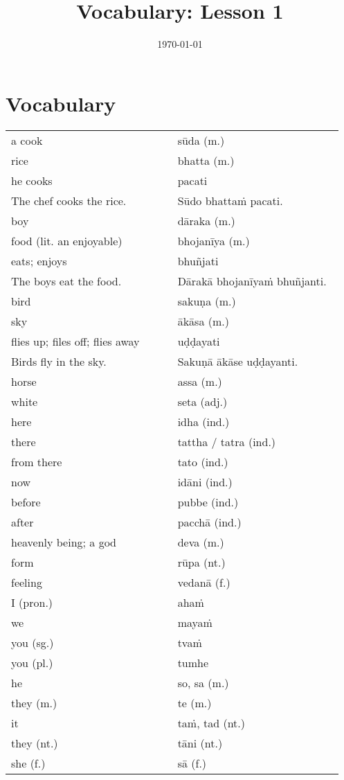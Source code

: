 \documentclass[a5paper]{memoir}
\date{\today}
\title{Vocabulary: Lesson 1}
\begin{document}
\chapter{Vocabulary}
\label{sec:orgc15ddb6}

\begin{longtable}{L{0.48\linewidth} L{0.48\linewidth}}
a cook & sūda (m.)\\[0pt]
rice & bhatta (m.)\\[0pt]
he cooks & pacati\\[0pt]
The chef cooks the rice. & Sūdo bhattaṁ pacati.\\[0pt]
boy & dāraka (m.)\\[0pt]
food (lit. an enjoyable) & bhojanīya (m.)\\[0pt]
eats; enjoys & bhuñjati\\[0pt]
The boys eat the food. & Dārakā bhojanīyaṁ bhuñjanti.\\[0pt]
bird & sakuṇa (m.)\\[0pt]
sky & ākāsa (m.)\\[0pt]
flies up; files off; flies away & uḍḍayati\\[0pt]
Birds fly in the sky. & Sakuṇā ākāse uḍḍayanti.\\[0pt]
horse & assa (m.)\\[0pt]
white & seta (adj.)\\[0pt]
here & idha (ind.)\\[0pt]
there & tattha / tatra (ind.)\\[0pt]
from there & tato (ind.)\\[0pt]
now & idāni (ind.)\\[0pt]
before & pubbe (ind.)\\[0pt]
after & pacchā (ind.)\\[0pt]
heavenly being; a god & deva (m.)\\[0pt]
form & rūpa (nt.)\\[0pt]
feeling & vedanā (f.)\\[0pt]
I (pron.) & ahaṁ\\[0pt]
we & mayaṁ\\[0pt]
you (sg.) & tvaṁ\\[0pt]
you (pl.) & tumhe\\[0pt]
he & so, sa (m.)\\[0pt]
they (m.) & te (m.)\\[0pt]
it & taṁ, tad (nt.)\\[0pt]
they (nt.) & tāni (nt.)\\[0pt]
she (f.) & sā (f.)\\[0pt]

\end{longtable}
\end{document}
